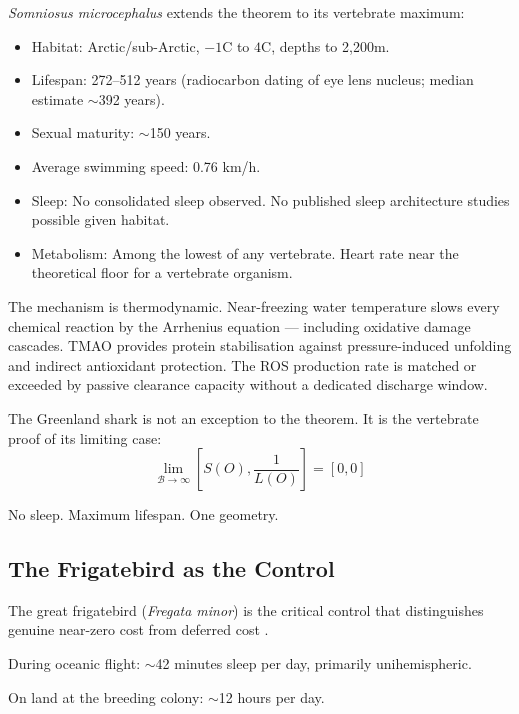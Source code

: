 \documentclass[12pt, a4paper]{article}
\begin{document}
\textit{Somniosus microcephalus} \cite{nielsen2016} extends
the theorem to its vertebrate maximum:

\begin{itemize}
    \item Habitat: Arctic/sub-Arctic, $-1$\textdegree C to
          $4$\textdegree C, depths to 2,200m.
    \item Lifespan: 272--512 years (radiocarbon dating of
          eye lens nucleus; median estimate $\sim$392 years).
    \item Sexual maturity: $\sim$150 years.
    \item Average swimming speed: 0.76 km/h.
    \item Sleep: No consolidated sleep observed. No
          published sleep architecture studies possible
          given habitat.
    \item Metabolism: Among the lowest of any vertebrate.
          Heart rate near the theoretical floor for a
          vertebrate organism.
\end{itemize}

The mechanism is thermodynamic. Near-freezing water
temperature slows every chemical reaction by the
Arrhenius equation --- including oxidative damage cascades.
TMAO provides protein stabilisation against
pressure-induced unfolding and indirect antioxidant
protection. The ROS production rate is matched or exceeded
by passive clearance capacity without a dedicated
discharge window.

The Greenland shark is not an exception to the theorem.
It is the vertebrate proof of its limiting case:
\begin{equation}
    \lim_{\mathcal{B} \rightarrow \infty}
    \left[ S(O), \frac{1}{L(O)} \right] = [0, 0]
\end{equation}

No sleep. Maximum lifespan. One geometry.

\subsection{The Frigatebird as the Control}

The great frigatebird (\textit{Fregata minor}) is the
critical control that distinguishes genuine near-zero cost
from deferred cost \cite{rattenborg2016}.

During oceanic flight: $\sim$42 minutes sleep per day,
primarily unihemispheric.

On land at the breeding colony: $\sim$12 hours per day.
\end{document}
